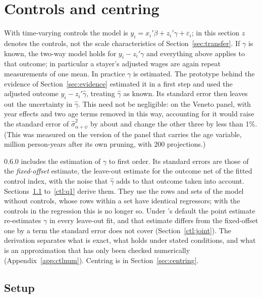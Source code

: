 \section{Controls and centring}\label{sec:controls}

With time-varying controls the model is $y_i=x_i'\beta+z_i'\gamma+\varepsilon_i$; in this section $z$ denotes the controls, not the scale characteristics of Section~\ref{sec:transfer}. If $\gamma$ is known, the
two-way model holds for $y_i-z_i'\gamma$ and everything above applies to that outcome; in particular a stayer's
adjusted wages are again repeat measurements of one mean. In practice $\gamma$ is estimated. The prototype behind
the evidence of Section~\ref{sec:evidence} estimated it in a first step and used the adjusted outcome
$y_i-z_i'\hat\gamma$, treating $\hat\gamma$ as known. Its standard error then leaves out the uncertainty in
$\hat\gamma$. This need not be negligible: on the Veneto panel, with year effects and two age terms removed in this
way, accounting for it would raise the standard error of $\hat\sigma^2_{\alpha+\psi}$ by about  and
change the other three by less than 1\%. (This was measured on the version of the panel that carries the age
variable,  million person-years after its own pruning, with 200 projections.)

\fevc{} 0.6.0 includes the estimation of $\gamma$ to first order. Its standard errors are those of the
\emph{fixed-offset} estimate, the leave-out estimate for the outcome net of the fitted control index, with the
noise that $\hat\gamma$ adds to that outcome taken into account. Sections~\ref{ctl:setup} to~\ref{ctl:q1} derive
them. They use the rows and sets of the model without controls, whose rows within a set have identical regressors;
with the controls in the regression this is no longer so. Under \fevc's default  the point
estimate re-estimates $\gamma$ in every leave-out fit, and that estimate differs from the fixed-offset one by a term
the standard error does not cover (Section~\ref{ctl:joint}). The derivation separates what is exact, what holds
under stated conditions, and what is an approximation that has only been checked numerically
(Appendix~\ref{app:ctlnum}). Centring is in Section~\ref{sec:centring}.

\subsection{Setup}\label{ctl:setup}


